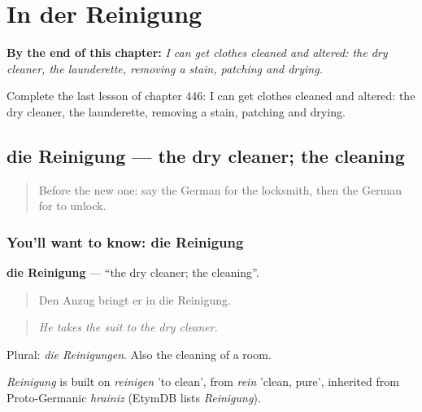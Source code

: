 
\chapter{In der Reinigung}
\label{ch:ge-in-der-reinigung}

\begin{chapteropening}
\textbf{By the end of this chapter:} \emph{I can get clothes cleaned and altered: the dry cleaner, the launderette, removing a stain, patching and drying.}

Complete the last lesson of chapter 446: I can get clothes cleaned and altered: the dry cleaner, the launderette, removing a stain, patching and drying.
\end{chapteropening}

\section[die Reinigung]{die Reinigung — the dry cleaner; the cleaning}

\label{lesson:GE-C446-reinigung}



\begin{quote}
Before the new one: say the German for the locksmith, then the German for to unlock.
\end{quote}

\subsection*{You'll want to know: die Reinigung}
\textbf{die Reinigung} — \textquotedblleft{}the dry cleaner; the cleaning\textquotedblright{}.

\begin{quote}
Den Anzug bringt er in die Reinigung.
\end{quote}

\begin{quote}
\emph{He takes the suit to the dry cleaner.}
\end{quote}

Plural: \emph{die Reinigungen}. Also the cleaning of a room.

\begin{cousinweb}
\emph{Reinigung} is built on \emph{reinigen} 'to clean', from \emph{rein} 'clean, pure', inherited from Proto-Germanic \emph{hrainiz} (EtymDB lists \emph{Reinigung}).
\end{cousinweb}

